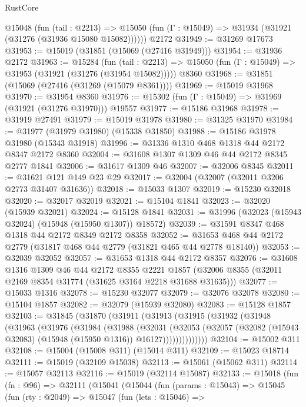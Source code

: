 \begin{lexlean}{RustCore}
\begin{coremodule}
    @15048
      (fun (tail : @2213) =>
      @15050 (fun (Γ : @15049) => @31934 (@31921 (@31276 (@31936 @15080 @15082))))))
    @2172
@31949 := @31269 @17673
@31953 := @15019 (@31851 (@15069 (@27416 @31949)))
@31954 := @31936 @2172
@31963 := @15284
    (fun (tail : @2213) => @15050 (fun (Γ : @15049) => @31953 (@31921 (@31276 (@31954 @15082)))))
    @8360
@31968 := @31851 (@15069 (@27416 (@31269 (@15079 @8361))))
@31969 := @15019 @31968
@31970 := @31954 @8360
@31976 := @15302 (fun (Γ : @15049) => @31969 (@31921 (@31276 @31970))) @19557
@31977 := @15186 @31968
@31978 := @31919 @27491
@31979 := @15019 @31978
@31980 := @31325 @31970
@31984 := @31977 (@31979 @31980) (@15338 @31850)
@31988 := @15186 @31978 @31980 (@15343 @31918)
@31996 := @31336 @1310 @468 @1318 @44 @2172 @8347 @2172 @8360
@32004 := @31608 @1307 @1309 @46 @44 @2172 @8345 @2777 @1841
@32006 := @31617 @1309 @46
@32007 := @32006 @8345
@32011 := @31621 @121 @149 @23 @29
@32017 := @32004 (@32007 (@32011 @3206 @2773 @31407 @31636))
@32018 := @15033 @1307
@32019 := @15230 @32018
@32020 := @32017 @32019
@32021 := @15104 @1841
@32023 := @32020 (@15939 @32021)
@32024 := @15128 @1841
@32031 := @31996 (@32023 (@15943 @32024) (@15948 (@15950 @1307)) @18572)
@32039 := @31591 @8347 @468 @1318 @44 @2172 @8349 @2172 @8358
@32052 := @31653 @468 @44 @2172 @2779 (@31817 @468 @44 @2779 (@31821 @465 @44 @2778 @18140))
@32053 := @32039 @32052
@32057 := @31653 @1318 @44 @2172 @8357
@32076 := @31608
    @1316
    @1309
    @46
    @44
    @2172
    @8355
    @2221
    @1857
    (@32006 @8355 (@32011 @2169 @8354 @31774 (@31625 @3164 @2218 @31688 @31635)))
@32077 := @15033 @1316
@32078 := @15230 @32077
@32079 := @32076 @32078
@32080 := @15104 @1857
@32082 := @32079 (@15939 @32080)
@32083 := @15128 @1857
@32103 := @31845
    (@31870
      (@31911
        (@31913
          (@31915
            (@31932
              (@31948
                (@31963
                  (@31976
                    (@31984
                      (@31988
                        (@32031
                          (@32053
                            (@32057
                              (@32082 (@15943 @32083) (@15948 (@15950 @1316)) @16127))))))))))))))
@32104 := @15002 @311
@32108 := @15004 (@15008 @311) (@15014 @311)
@32109 := @15023 @18714
@32111 := @15019 (@32109 @15038)
@32113 := @15061 (@15062 @311)
@32114 := @15057 @32113
@32116 := @15019 (@32114 @15087)
@32133 := @15018
    (fun (fn : @96) =>
    @32111
      (@15041
        (@15044
          (fun (params : @15043) =>
          @15045
            (fun (rty : @2049) =>
            @15047
              (fun (lets : @15046) =>

\end{coremodule}
\end{lexlean}
